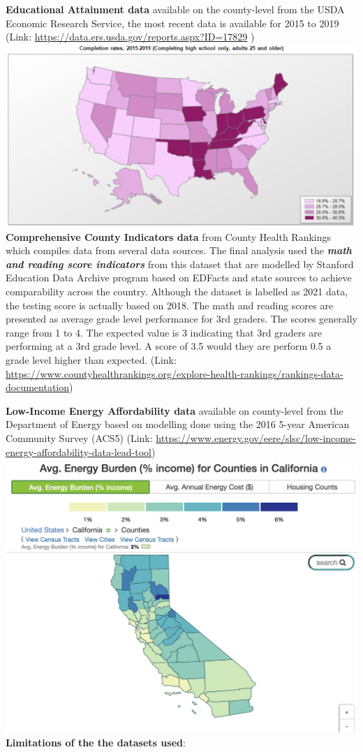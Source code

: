 \documentclass[
]{article}
\begin{document}
\textbf{Educational Attainment data} available on the county-level from
the USDA Economic Research Service, the most recent data is available
for 2015 to 2019 (Link:
\url{https://data.ers.usda.gov/reports.aspx?ID=17829} )
\includegraphics{img/educ-attainment.png} \textbf{Comprehensive County
Indicators data} from County Health Rankings which compiles data from
several data sources. The final analysis used the \textbf{\emph{math and
reading score indicators}} from this dataset that are modelled by
Stanford Education Data Archive program based on EDFacts and state
sources to achieve comparability across the country. Although the
dataset is labelled as 2021 data, the testing score is actually based on
2018. The math and reading scores are presented as average grade level
performance for 3rd graders. The scores generally range from 1 to 4. The
expected value is 3 indicating that 3rd graders are performing at a 3rd
grade level. A score of 3.5 would they are perform 0.5 a grade level
higher than expected. (Link:
\url{https://www.countyhealthrankings.org/explore-health-rankings/rankings-data-documentation})

\textbf{Low-Income Energy Affordability data} available on county-level
from the Department of Energy based on modelling done using the 2016
5-year American Community Survey (ACS5) (Link:
\url{https://www.energy.gov/eere/slsc/low-income-energy-affordability-data-lead-tool})
\includegraphics{img/CA-lead-tool-map.png} \textbf{Limitations of the
the datasets used}:
\end{document}

